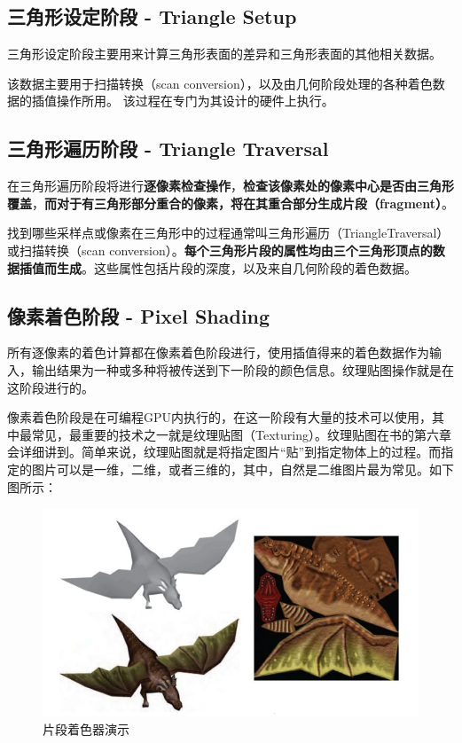 \documentclass[UTF8,a4paper,12pt]{ctexbook}
\begin{document}
			\subsection{三角形设定阶段 - Triangle Setup}
				三角形设定阶段主要用来计算三角形表面的差异和三角形表面的其他相关数据。
				
				该数据主要用于扫描转换（scan conversion），以及由几何阶段处理的各种着色数据的插值操作所用。 该过程在专门为其设计的硬件上执行。
				 
			\subsection{三角形遍历阶段 - Triangle Traversal}
				在三角形遍历阶段将进行\textbf{逐像素检查操作}，\textbf{检查该像素处的像素中心是否由三角形覆盖}，\textbf{而对于有三角形部分重合的像素，将在其重合部分生成片段（fragment）}。
				
				找到哪些采样点或像素在三角形中的过程通常叫三角形遍历（TriangleTraversal）或扫描转换（scan conversion）。\textbf{每个三角形片段的属性均由三个三角形顶点的数据插值而生成}。这些属性包括片段的深度，以及来自几何阶段的着色数据。

			\subsection{像素着色阶段 - Pixel Shading}
				所有逐像素的着色计算都在像素着色阶段进行，使用插值得来的着色数据作为输入，输出结果为一种或多种将被传送到下一阶段的颜色信息。纹理贴图操作就是在这阶段进行的。
				
				像素着色阶段是在可编程GPU内执行的，在这一阶段有大量的技术可以使用，其中最常见，最重要的技术之一就是纹理贴图（Texturing）。纹理贴图在书的第六章会详细讲到。简单来说，纹理贴图就是将指定图片“贴”到指定物体上的过程。而指定的图片可以是一维，二维，或者三维的，其中，自然是二维图片最为常见。如下图所示：
					\begin{figure}[H]
						\centering
						\includegraphics[scale=0.57]{PixShader}
						\caption{片段着色器演示}
					\end{figure}
				
\end{document}
